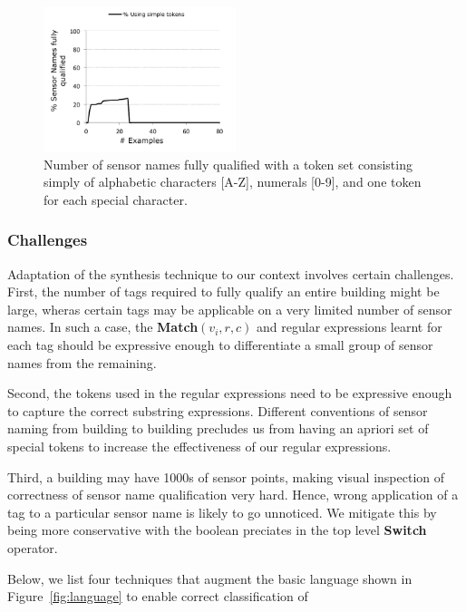 \begin{figure}[h!]
  
  \centering
    \includegraphics[width=0.5\textwidth]{figs/gulwani-noconverge.pdf}
\caption{Number of sensor names fully qualified with a token set consisting simply of alphabetic characters [A-Z], numerals [0-9], and one token for each special character.}
\label{fig:simpleTokenNoCoverage}
\end{figure}

\subsubsection{Challenges}

Adaptation of the synthesis technique to our context involves certain challenges. First, the number of tags required to fully qualify an entire building might be large, wheras certain tags may be applicable on a very limited number of sensor names. In such a case, the {\bf Match}$(v_i,r,c)$ and regular expressions learnt for each tag should be expressive enough to differentiate a small group of sensor names from the remaining. 

Second, the tokens used in the regular expressions need to be expressive enough to capture the correct substring expressions. Different conventions of sensor naming from building to building precludes us from having an apriori set of special tokens to increase the effectiveness of our regular expressions.

Third, a building may have 1000s of sensor points, making visual inspection of correctness of sensor name qualification very hard. Hence, wrong application of a tag to a particular sensor name is likely to go unnoticed. We mitigate this by being more conservative with the boolean preciates in the top level {\bf Switch} operator. 


Below, we list four techniques that augment the basic language shown in Figure~\ref{fig:language} to enable correct classification of 

